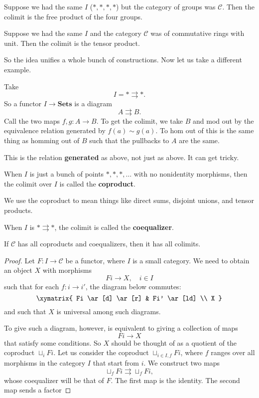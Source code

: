 \begin{example}
Suppose we had the same $I$ ($\ast, \ast, \ast, \ast$) but the category of
groups was $\mathcal{C}$. Then the colimit is the
free product of the four groups.
\end{example}

\begin{example}
Suppose we had the same $I$ and the category $\mathcal{C}$ was of commutative
rings with unit. Then the colimit is the tensor product.
\end{example}

So the idea unifies a whole bunch of constructions.
Now let us take a different example.

\begin{example}
Take
\[ I = \ast \rightrightarrows \ast.  \]
So a functor $I \to \mathbf{Sets}$ is a diagram
\[ A \rightrightarrows B.  \]
Call the two maps $f,g: A \to B$. To get the colimit, we take $B$ and mod out
by the equivalence relation generated by $f(a) \sim g(a)$.
To hom out of this is the same thing as homming  out of $B$ such that the
pullbacks to $A$ are the same.

This is the relation \textbf{generated} as above, not just as above. It can get
tricky.
\end{example}

\begin{definition}
When $I$ is just a bunch of points  $\ast, \ast, \ast, \dots$ with no
nonidentity morphisms, then the
colimit over $I$ is called the \textbf{coproduct}.
\end{definition}

We use the coproduct to mean things like direct sums, disjoint unions, and
tensor products.

\begin{definition}
When $I$ is $\ast \rightrightarrows \ast$, the colimit is called the
\textbf{coequalizer}.
\end{definition}

\begin{theorem} \label{coprodcoequalsufficeforcocomplete}
If $\mathcal{C}$ has all coproducts and coequalizers, then it has all colimits.
\end{theorem}

\begin{proof}
Let $F: I \to \mathcal{C}$ be a functor, where $I$ is a small category. We
need to obtain an object $X$ with morphisms
\[ Fi \to X, \quad i \in I  \]
such that for each $f: i \to i'$, the diagram below commutes:
\[
\xymatrix{
Fi \ar[d] \ar[r] &  Fi' \ar[ld] \\
X
}
\]
and such that $X$ is universal among such diagrams.

To give such a diagram, however, is equivalent to giving a collection of maps
\[ Fi \to X  \]
that satisfy some conditions. So $X$ should be thought of as a quotient of the
coproduct $\sqcup_i Fi$.
Let us consider the coproduct $\sqcup_{i \in I, f} Fi$, where $f$ ranges over
all
morphisms in the category $I$ that start from $i$.
We construct two maps
\[ \sqcup_f Fi \rightrightarrows \sqcup_f Fi,  \]
whose coequalizer will be that of $F$. The first map is the identity. The
second map sends a factor
\end{proof}

